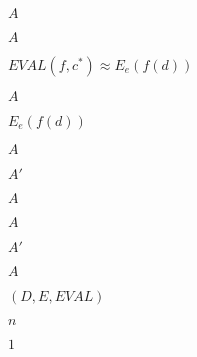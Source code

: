 \documentclass[10pt]{book}
\begin{document}
\begin{mdSnippets}
\begin{mdInlineSnippet}[7fc56270e7a70fa81a5935b72eacbe29]
$A$\end{mdInlineSnippet}%
\begin{mdInlineSnippet}[7fc56270e7a70fa81a5935b72eacbe29]%
$A$\end{mdInlineSnippet}%
\begin{mdInlineSnippet}[2b79aa8cf63ab8602ac20540709970dc]%
$EVAL(f,c^*) \approx E_e(f(d))$\end{mdInlineSnippet}%
\begin{mdInlineSnippet}[7fc56270e7a70fa81a5935b72eacbe29]%
$A$\end{mdInlineSnippet}%
\begin{mdInlineSnippet}[98c799af4ee4d66626cf71bf22778d97]%
$E_e(f(d))$\end{mdInlineSnippet}%
\begin{mdInlineSnippet}[7fc56270e7a70fa81a5935b72eacbe29]%
$A$\end{mdInlineSnippet}%
\begin{mdInlineSnippet}[37a12b78a9ca96989ad7ceceacb37ea2]%
$A'$\end{mdInlineSnippet}%
\begin{mdInlineSnippet}[7fc56270e7a70fa81a5935b72eacbe29]%
$A$\end{mdInlineSnippet}%
\begin{mdInlineSnippet}[7fc56270e7a70fa81a5935b72eacbe29]%
$A$\end{mdInlineSnippet}%
\begin{mdInlineSnippet}[37a12b78a9ca96989ad7ceceacb37ea2]%
$A'$\end{mdInlineSnippet}%
\begin{mdInlineSnippet}[7fc56270e7a70fa81a5935b72eacbe29]%
$A$\end{mdInlineSnippet}%
\begin{mdInlineSnippet}[430da725176c314ceb1cb71f89193ee2]%
$(D,E,EVAL)$\end{mdInlineSnippet}%
\begin{mdInlineSnippet}[7b8b965ad4bca0e41ab51de7b31363a1]%
$n$\end{mdInlineSnippet}%
\begin{mdInlineSnippet}[c4ca4238a0b923820dcc509a6f75849b]%
$1$\end{mdInlineSnippet}%

\end{mdSnippets}
\end{document}
